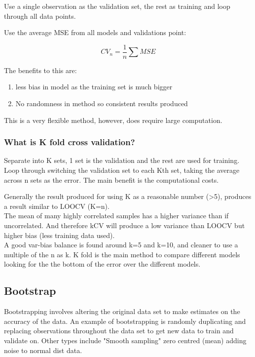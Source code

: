 \documentclass[11pt]{scrartcl} %
\begin{document}
Use a single observation as the validation set, the rest as training and loop through all data points.

Use the average MSE from all models and validations point:

\begin{equation}
	CV_n = \frac{1}{n} \sum MSE
\end{equation}

The benefits to this are:
\begin{enumerate}
	\item less bias in model as the training set is much bigger
	\item No randomness in method so consistent results produced
\end{enumerate}

This is a very flexible method, however, does require large computation.

\subsubsection{What is K fold cross validation?}

Separate into K sets, 1 set is the validation and the rest are used for training. Loop through switching
the validation set to each Kth set, taking the average across n sets as the error. 
The main benefit is the computational costs.

Generally the result produced for using K as a reasonable number (>5), produces a result similar to
LOOCV (K=n).\\

The mean of many highly correlated samples has a higher variance than if uncorrelated. And therefore
kCV will produce a low variance than LOOCV but higher bias (less training data used).\\

A good var-bias balance is found around k=5 and k=10, and cleaner to use a multiple of the n as k.
K fold is the main method to compare different models looking for the the bottom of the error over the
different models.

\subsection{Bootstrap}

Bootstrapping involves altering the original data set to make estimates on the accuracy of the data.
An example of bootstrapping is randomly duplicating and replacing observations throughout the data set
to get new data to train and validate on. Other types include "Smooth sampling" zero centred (mean) 
adding noise to normal dist data. \\
\end{document}
